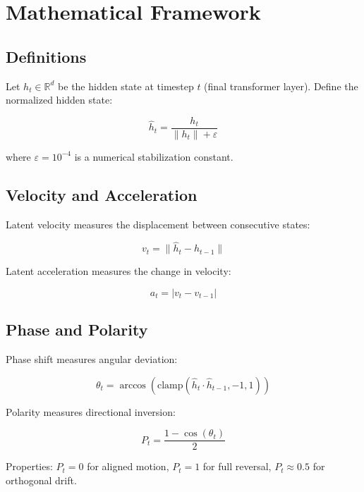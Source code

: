 \documentclass[12pt,a4paper]{article}
\begin{document}
\section{Mathematical Framework}

\subsection{Definitions}

Let $h_t \in \mathbb{R}^d$ be the hidden state at timestep $t$ (final transformer layer). Define the normalized hidden state:

\begin{equation}
\hat{h}_t = \frac{h_t}{\|h_t\| + \varepsilon}
\end{equation}

where $\varepsilon = 10^{-4}$ is a numerical stabilization constant.

\subsection{Velocity and Acceleration}

Latent velocity measures the displacement between consecutive states:

\begin{equation}
v_t = \|\hat{h}_t - \hat{h}_{t-1}\|
\end{equation}

Latent acceleration measures the change in velocity:

\begin{equation}
a_t = |v_t - v_{t-1}|
\end{equation}

\subsection{Phase and Polarity}

Phase shift measures angular deviation:

\begin{equation}
\theta_t = \arccos\left(\text{clamp}(\hat{h}_t \cdot \hat{h}_{t-1}, -1, 1)\right)
\end{equation}

Polarity measures directional inversion:

\begin{equation}
P_t = \frac{1 - \cos(\theta_t)}{2}
\end{equation}

Properties: $P_t = 0$ for aligned motion, $P_t = 1$ for full reversal, $P_t \approx 0.5$ for orthogonal drift.
\end{document}

